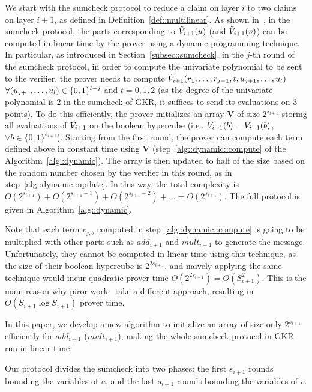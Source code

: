 We start with the sumcheck protocol to reduce a claim on layer $i$ to two claims on layer $i+1$, as defined in Definition~\ref{def::multilinear}. As shown in~\cite{CMT}, in the sumcheck protocol, the parts corresponding to $\tilde{V}_{i+1}(u)$ (and $\tilde{V}_{i+1}(v)$) can be computed in linear time by the prover using a dynamic programming technique. In particular, as introduced in Section~\ref{subsec::sumcheck}, in the $j$-th round of the sumcheck protocol, in order to compute the univariate polynomial to be sent to the verifier, the prover needs to compute $\tilde{V}_{i+1}(r_1, \ldots, r_{j-1}, t, u_{j+1}, \ldots, u_l)$ $\forall (u_{j+1},\ldots,u_l)\in\{0,1\}^{l-j}$ and $t = 0,1,2$ (as the degree of the univariate polynomial is 2 in the sumcheck of GKR, it suffices to send its evaluations on 3 points). To do this efficiently, the prover initializes an array $\textbf{V}$ of size $2^{s_{i+1}}$ storing all evaluations of $\tilde{V}_{i+1}$ on the boolean hypercube (i.e., $\tilde{V}_{i+1}(b) = V_{i+1}(b)$, $\forall b\in\{0,1\}^{s_{i+1}}$). Starting from the first round, the prover can compute each term defined above in constant time using $\textbf{V}$ (step~\ref{alg::dynamic::compute} of the Algorithm~\ref{alg::dynamic}). The array is then updated to half of the size based on the random number chosen by the verifier in this round, as in step~\ref{alg::dynamic::update}. In this way, the total complexity is $O(2^{s_{i+1}})+ O(2^{s_{i+1}-1}) + O(2^{s_{i+1}-2}) + \ldots = O(2^{s_{i+1}})$. The full protocol is given in Algorithm~\ref{alg::dynamic}. 

Note that each term $v_{j,b}$ computed in step~\ref{alg::dynamic::compute} is going to be multiplied with other parts such as $\tilde{add}_{i+1}$ and $\tilde{mult}_{i+1}$ to generate the message. Unfortunately, they cannot be computed in linear time using this technique, as the size of their boolean hypercube is $2^{2s_{i+1}}$, and naively applying the same technique would incur quadratic prover time $O(2^{2s_{i+1}}) = O(S_{i+1}^2)$. This is the main reason why piror work~\cite{CMT,...} take a different approach, resulting in $O(S_{i+1}\log S_{i+1})$ prover time.

In this paper, we develop a new algorithm to initialize an array of size only $2^{s_{i+1}}$ efficiently for $\tilde{add}_{i+1}$ ($\tilde{mult}_{i+1}$), making the whole sumcheck protocol in GKR run in linear time. 

Our protocol divides the sumcheck into two phases: the first $s_{i+1}$ rounds bounding the variables of $u$, and the last $s_{i+1}$ rounds bounding the variables of $v$.

